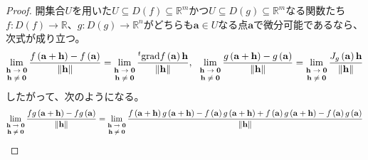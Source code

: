\documentclass[dvipdfmx]{jsarticle}
\begin{document}
\begin{proof}
開集合$U$を用いた$U \subseteq D(f) \subseteq \mathbb{R}^{m}$かつ$U \subseteq D(g) \subseteq \mathbb{R}^{m}$なる関数たち$f:D(f) \rightarrow \mathbb{R}$、$g:D(g) \rightarrow \mathbb{R}^{n}$がどちらも$\mathbf{a} \in U$なる点$\mathbf{a}$で微分可能であるなら、次式が成り立つ。
\begin{align*}
\lim_{\scriptsize \begin{matrix}
\mathbf{h} \rightarrow \mathbf{0} \\
\mathbf{h} \neq \mathbf{0} \\
\end{matrix}}\frac{f\left( \mathbf{a} + \mathbf{h} \right) - f\left( \mathbf{a} \right)}{\left\| \mathbf{h} \right\|} = \lim_{\scriptsize \begin{matrix}
\mathbf{h} \rightarrow \mathbf{0} \\
\mathbf{h} \neq \mathbf{0} \\
\end{matrix}}\frac{{}^{t}\mathrm{grad}f\left( \mathbf{a} \right)\mathbf{h}}{\left\| \mathbf{h} \right\|},\ \ \lim_{\scriptsize \begin{matrix}
\mathbf{h} \rightarrow \mathbf{0} \\
\mathbf{h} \neq \mathbf{0} \\
\end{matrix}}\frac{g\left( \mathbf{a} + \mathbf{h} \right) - g\left( \mathbf{a} \right)}{\left\| \mathbf{h} \right\|} = \lim_{\scriptsize \begin{matrix}
\mathbf{h} \rightarrow \mathbf{0} \\
\mathbf{h} \neq \mathbf{0} \\
\end{matrix}}\frac{J_{g}\left( \mathbf{a} \right)\mathbf{h}}{\left\| \mathbf{h} \right\|}
\end{align*}
したがって、次のようになる。
\begin{align*}
\lim_{\scriptsize \begin{matrix}
\mathbf{h} \rightarrow \mathbf{0} \\
\mathbf{h} \neq \mathbf{0} \\
\end{matrix}}\frac{fg\left( \mathbf{a} + \mathbf{h} \right) - fg\left( \mathbf{a} \right)}{\left\| \mathbf{h} \right\|} &= \lim_{\scriptsize \begin{matrix}
\mathbf{h} \rightarrow \mathbf{0} \\
\mathbf{h} \neq \mathbf{0} \\
\end{matrix}}\frac{f\left( \mathbf{a} + \mathbf{h} \right)g\left( \mathbf{a} + \mathbf{h} \right) - f\left( \mathbf{a} \right)g\left( \mathbf{a} + \mathbf{h} \right) + f\left( \mathbf{a} \right)g\left( \mathbf{a} + \mathbf{h} \right) - f\left( \mathbf{a} \right)g\left( \mathbf{a} \right)}{\left\| \mathbf{h} \right\|}\\

\end{align*}
\end{proof}
\end{document}
